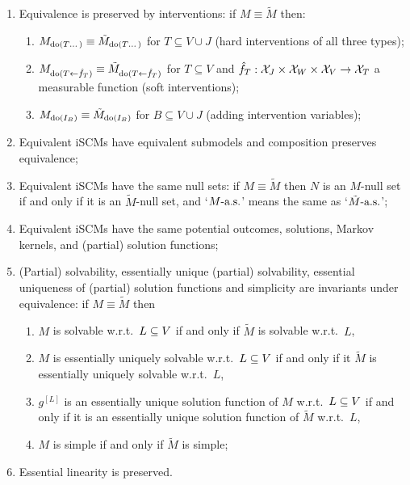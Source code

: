 \begin{Prp}\label{prp:equivalent_scms}
\begin{enumerate}
  \item Equivalence is preserved by interventions:
    if $M \equiv \tilde{M}$ then:
    \begin{enumerate}
      \item $M_{\operatorname{do}(T\dots)} \equiv \tilde{M}_{\operatorname{do}(T\dots)}$ for $T \subseteq V \cup J$ (hard interventions of all three types);
      \item $M_{\operatorname{do}(T\mathrel{\leftarrow}\hat{f}_T)} \equiv \tilde{M}_{\operatorname{do}(T\mathrel{\leftarrow}\hat{f}_T)}$ for $T \subseteq V$ and $\hat f_T : \mathcal{X}_J \times \mathcal{X}_W \times \mathcal{X}_V \to \mathcal{X}_T$ a measurable function
        (soft interventions);
      \item $M_{\operatorname{do}(I_B)} \equiv \tilde{M}_{\operatorname{do}(I_B)}$ for $B \subseteq V \cup J$ (adding intervention variables);
    \end{enumerate}
  \item Equivalent iSCMs have equivalent submodels and composition preserves equivalence;
  \item Equivalent iSCMs have the same null sets:
    if $M \equiv \tilde{M}$ then $N$ is an $M$-null set if and only if it is an $\tilde{M}$-null set, and `$M\text{-a.s.}$' means the same as `$\tilde{M}\text{-a.s.}$';
  \item Equivalent iSCMs have the same potential outcomes, solutions, Markov kernels, and (partial) solution functions;
  \item (Partial) solvability, essentially unique (partial) solvability, essential uniqueness of (partial) solution functions and simplicity are invariants under equivalence:
    if $M \equiv \tilde{M}$ then 
    \begin{enumerate}
      \item $M$ is solvable w.r.t.\ $L \subseteq V$ if and only if $\tilde{M}$ is solvable w.r.t.\ $L$,
      \item $M$ is essentially uniquely solvable w.r.t.\ $L \subseteq V$ if and only if it $\tilde{M}$ is essentially uniquely solvable w.r.t.\ $L$,
      \item $g^{[L]}$ is an essentially unique solution function of $M$ w.r.t.\ $L \subseteq V$ if and only if it is an essentially unique solution function of $\tilde{M}$ w.r.t.\ $L$,
      \item $M$ is simple if and only if $\tilde{M}$ is simple;
    \end{enumerate}
  \item Essential linearity is preserved.    
\end{enumerate}
\end{Prp}
